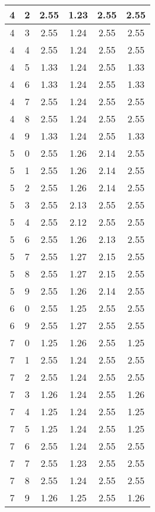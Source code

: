\begin{longtable}{|c|c||c||c|c||c|}
	4 & 2 & 2.55 & 1.23 & 2.55 & 2.55 \\ \hline
	4 & 3 & 2.55 & 1.24 & 2.55 & 2.55 \\ \hline
	4 & 4 & 2.55 & 1.24 & 2.55 & 2.55 \\ \hline
	4 & 5 & 1.33 & 1.24 & 2.55 & 1.33 \\ \hline
	4 & 6 & 1.33 & 1.24 & 2.55 & 1.33 \\ \hline
	4 & 7 & 2.55 & 1.24 & 2.55 & 2.55 \\ \hline
	4 & 8 & 2.55 & 1.24 & 2.55 & 2.55 \\ \hline
	4 & 9 & 1.33 & 1.24 & 2.55 & 1.33 \\ \hline
	5 & 0 & 2.55 & 1.26 & 2.14 & 2.55 \\ \hline
	5 & 1 & 2.55 & 1.26 & 2.14 & 2.55 \\ \hline
	5 & 2 & 2.55 & 1.26 & 2.14 & 2.55 \\ \hline
	5 & 3 & 2.55 & 2.13 & 2.55 & 2.55 \\ \hline
	5 & 4 & 2.55 & 2.12 & 2.55 & 2.55 \\ \hline
	5 & 6 & 2.55 & 1.26 & 2.13 & 2.55 \\ \hline
	5 & 7 & 2.55 & 1.27 & 2.15 & 2.55 \\ \hline
	5 & 8 & 2.55 & 1.27 & 2.15 & 2.55 \\ \hline
	5 & 9 & 2.55 & 1.26 & 2.14 & 2.55 \\ \hline
	6 & 0 & 2.55 & 1.25 & 2.55 & 2.55 \\ \hline
	6 & 9 & 2.55 & 1.27 & 2.55 & 2.55 \\ \hline
	7 & 0 & 1.25 & 1.26 & 2.55 & 1.25 \\ \hline
	7 & 1 & 2.55 & 1.24 & 2.55 & 2.55 \\ \hline
	7 & 2 & 2.55 & 1.24 & 2.55 & 2.55 \\ \hline
	7 & 3 & 1.26 & 1.24 & 2.55 & 1.26 \\ \hline
	7 & 4 & 1.25 & 1.24 & 2.55 & 1.25 \\ \hline
	7 & 5 & 1.25 & 1.24 & 2.55 & 1.25 \\ \hline
	7 & 6 & 2.55 & 1.24 & 2.55 & 2.55 \\ \hline
	7 & 7 & 2.55 & 1.23 & 2.55 & 2.55 \\ \hline
	7 & 8 & 2.55 & 1.24 & 2.55 & 2.55 \\ \hline
	7 & 9 & 1.26 & 1.25 & 2.55 & 1.26 \\ \hline
\end{longtable}
\clearpage{}

